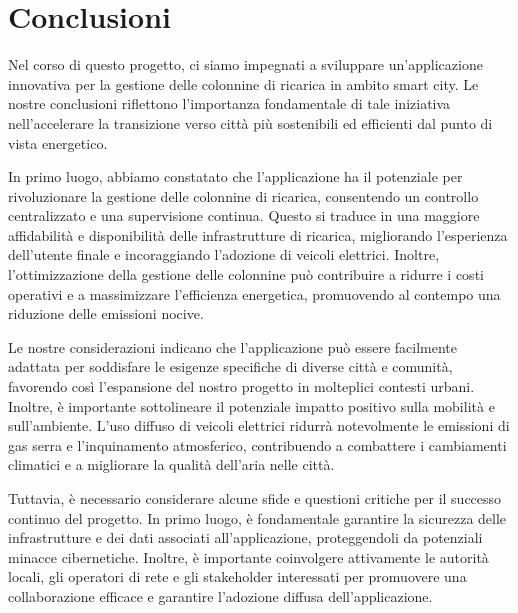 



\section{Conclusioni}

Nel corso di questo progetto, ci siamo impegnati a sviluppare un'applicazione innovativa per
la gestione delle colonnine di ricarica in ambito smart city. Le nostre conclusioni riflettono
l'importanza fondamentale di tale iniziativa nell'accelerare la transizione verso città più
sostenibili ed efficienti dal punto di vista energetico.

In primo luogo, abbiamo constatato che l'applicazione ha il potenziale per rivoluzionare la
gestione delle colonnine di ricarica, consentendo un controllo centralizzato e una supervisione
continua. Questo si traduce in una maggiore affidabilità e disponibilità delle infrastrutture
di ricarica, migliorando l'esperienza dell'utente finale e incoraggiando l'adozione di veicoli
elettrici. Inoltre, l'ottimizzazione della gestione delle colonnine può contribuire a ridurre
i costi operativi e a massimizzare l'efficienza energetica, promuovendo al contempo una riduzione
delle emissioni nocive.

Le nostre considerazioni indicano che l'applicazione può essere facilmente adattata per soddisfare
le esigenze specifiche di diverse città e comunità, favorendo così l'espansione del nostro progetto
in molteplici contesti urbani. Inoltre, è importante sottolineare il potenziale impatto positivo sulla
mobilità e sull'ambiente. L'uso diffuso di veicoli elettrici ridurrà notevolmente le emissioni di gas
serra e l'inquinamento atmosferico, contribuendo a combattere i cambiamenti climatici e a migliorare
la qualità dell'aria nelle città.

Tuttavia, è necessario considerare alcune sfide e questioni critiche per il successo continuo
del progetto. In primo luogo, è fondamentale garantire la sicurezza delle infrastrutture e dei
dati associati all'applicazione, proteggendoli da potenziali minacce cibernetiche. Inoltre,
è importante coinvolgere attivamente le autorità locali, gli operatori di rete e gli stakeholder
interessati per promuovere una collaborazione efficace e garantire l'adozione diffusa dell'applicazione.

